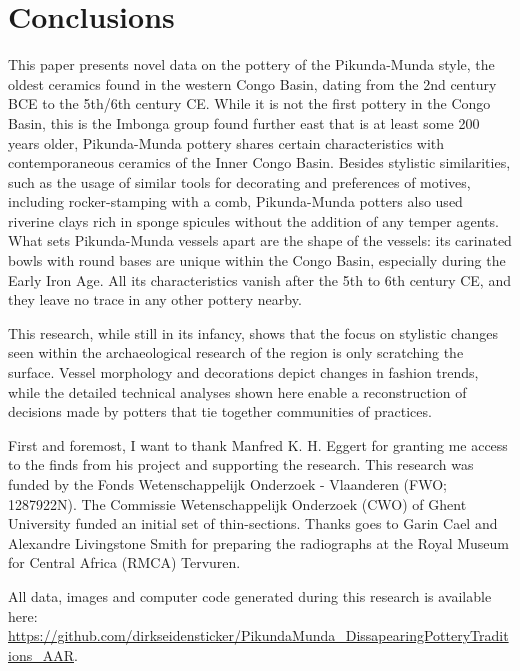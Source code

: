 \documentclass[smallextended,natbib]{svjour3}       %
\begin{document}
\section{Conclusions}

This paper presents novel data on the pottery of the Pikunda-Munda style, the oldest ceramics found in the western Congo Basin, dating from the 2nd century BCE to the 5th/6th century CE. While it is not the first pottery in the Congo Basin, this is the Imbonga group found further east that is at least some 200 years older, Pikunda-Munda pottery shares certain characteristics with contemporaneous ceramics of the Inner Congo Basin. Besides stylistic similarities, such as the usage of similar tools for decorating and preferences of motives, including rocker-stamping with a comb, Pikunda-Munda potters also used riverine clays rich in sponge spicules without the addition of any temper agents. What sets Pikunda-Munda vessels apart are the shape of the vessels: its carinated bowls with round bases are unique within the Congo Basin, especially during the Early Iron Age. All its characteristics vanish after the 5th to 6th century CE, and they leave no trace in any other pottery nearby.

This research, while still in its infancy, shows that the focus on stylistic changes seen within the archaeological research of the region \citep{Wotzka.1995,Seidensticker.2021e} is only scratching the surface. Vessel morphology and decorations depict changes in fashion trends, while the detailed technical analyses shown here enable a reconstruction of decisions made by potters that tie together communities of practices.

\begin{acknowledgements}
First and foremost, I want to thank Manfred K. H. Eggert for granting me access to the finds from his project and supporting the research. This research was funded by the Fonds Wetenschappelijk Onderzoek - Vlaanderen (FWO; 1287922N). The Commissie Wetenschappelijk Onderzoek (CWO) of Ghent University funded an initial set of thin-sections. Thanks goes to Garin Cael and Alexandre Livingstone Smith for preparing the radiographs at the Royal Museum for Central Africa (RMCA) Tervuren.

All data, images and computer code generated during this research is available here: \url{https://github.com/dirkseidensticker/PikundaMunda_DissapearingPotteryTraditions_AAR}.
\end{acknowledgements}



\end{document}
